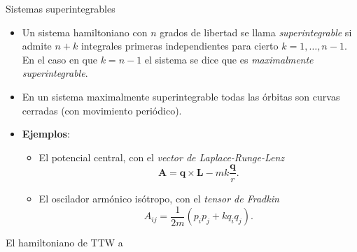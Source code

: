 \documentclass[aspectratio=169,mathserif]{beamer}
\newcommand{\vect}[1]{\mathbf{#1}}
\begin{document}
  \begin{frame}{Sistemas superintegrables}
    \begin{itemize}
      \item Un sistema hamiltoniano con $n$ grados de libertad se llama \emph{superintegrable} si admite $n+k$ integrales primeras independientes para cierto $k=1,\dots,n-1$. En el caso en que $k=n-1$ el sistema se dice que es \emph{maximalmente superintegrable}.
      \item En un sistema maximalmente superintegrable todas las órbitas son curvas cerradas (con movimiento periódico).
      \item \textbf{Ejemplos}:
	\begin{itemize}
	  \item El potencial central, con el \emph{vector de Laplace-Runge-Lenz} 
	    \begin{equation*}
	      \vect{A}=\vect{q}\times \vect{L} - mk\frac{\vect{q}}{r}.
	    \end{equation*}
	  \item El oscilador armónico isótropo, con el \emph{tensor de Fradkin}
	    \begin{equation*}
	      A_{ij}=\frac{1}{2m}(p_ip_j+kq_iq_j).
	    \end{equation*}
	\end{itemize}
    \end{itemize}
    
  \end{frame}

  \begin{frame}{El hamiltoniano de TTW}
    a
  \end{frame}
  
\end{document}
